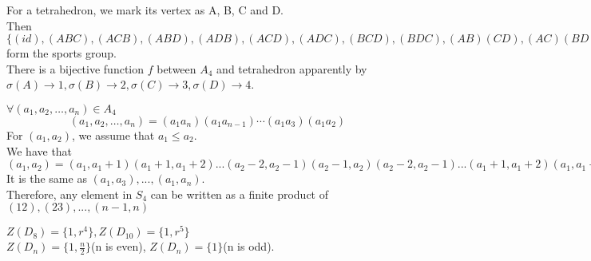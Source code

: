 \documentclass[a4paper, justified]{tufte-handout}
\begin{document}
\begin{solution}
For a tetrahedron,  we mark its vertex as A, B, C and D.\\
Then $\{(id), (ABC),(ACB), (ABD), (ADB), (ACD), (ADC), (BCD), (BDC), (AB)(CD), (AC)(BD), (AD)(BC)\}$ form the sports group.\\
There is a bijective function $f$ between $A_4$ and tetrahedron apparently by $\sigma(A)\to 1, \sigma(B)\to 2, \sigma(C)\to 3, \sigma(D)\to 4$.\\


\end{solution}

\begin{problem}[TJ 5-26(b)]
\end{problem}

\begin{solution}
$\forall (a_1,a_2,…,a_n)\in A_4$
$$(a_1,a_2,…,a_n)=(a_1 a_n)(a_1 a_{n−1} )⋯(a_1 a_3)(a_1 a_2)$$
For $(a_1, a_2)$, we assume that $a_1 \leq a_2$.\\
We have that $(a_1,a_2)=(a_1,a_1+1)(a_1+1,a_1+2)...(a_2-2,a_2-1)(a_2-1,a_2)(a_2-2,a_2-1)...(a_1+1,a_1+2)(a_1,a_1+1)$\\
It is the same as $(a_1,a_3),...,(a_1,a_n)$.\\
Therefore, any element in $S_4$ can be written as a finite product of $(12),(23),...,(n-1,n)$
\end{solution}

\begin{problem}[TJ 5-29]
\end{problem}

\begin{solution}
$Z(D_8)=\{1,r^4\}, Z(D_{10})=\{1, r^5\}$\\
$Z(D_n)=\{1,\frac{n}{2}\}$(n is even),  $Z(D_n)=\{1\}$(n is odd).  
\end{solution}

\begin{problem}[TJ 5-36]
\end{problem}
\end{document}
